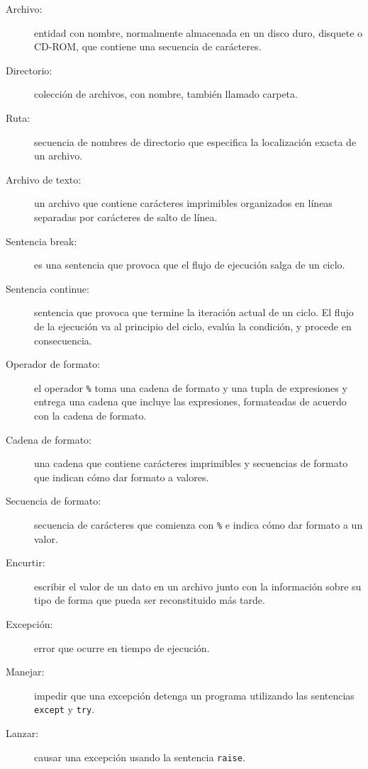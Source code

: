 \begin{description}

\item[Archivo:] entidad con nombre, normalmente almacenada en un disco
duro, disquete o CD-ROM, que contiene una secuencia de carácteres.

\item[Directorio:] colección de archivos, con nombre, también llamado carpeta.

\item[Ruta:] secuencia de nombres de directorio que especifica la localización
exacta de un archivo.

\item[Archivo de texto:] un archivo que contiene carácteres imprimibles organizados
en líneas separadas por carácteres de salto de línea.

\item[Sentencia break:] es una sentencia que provoca que el flujo de ejecución salga de
un ciclo.

\item[Sentencia continue:] sentencia que provoca que termine la
iteración actual de un ciclo. El flujo de la ejecución va al principio
del ciclo, evalúa la condición, y procede en consecuencia.

\item[Operador de formato:] el operador \texttt{\%} toma una cadena de
formato y una tupla de expresiones y entrega una cadena que incluye
las expresiones, formateadas de acuerdo con la cadena de formato.

\item[Cadena de formato:] una cadena que contiene carácteres imprimibles
y secuencias de formato que indican cómo dar formato a valores.

\item[Secuencia de formato:] secuencia de carácteres que comienza con
\texttt{\%} e indica cómo dar formato a un valor.

\item[Encurtir:] escribir el valor de un dato en un archivo junto con la
información sobre su tipo de forma que pueda ser reconstituido más tarde.

\item[Excepción:] error que ocurre en tiempo de ejecución.

\item[Manejar:] impedir que una excepción detenga un programa utilizando
las sentencias \texttt{except} y \texttt{try}.

\item[Lanzar:] causar una excepción usando la sentencia \texttt{raise}.

\end{description}



